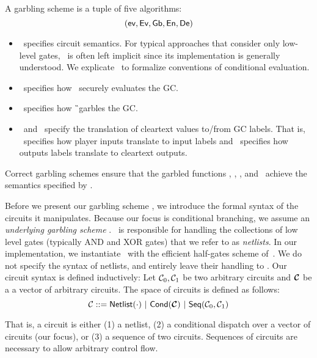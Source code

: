 A garbling scheme is a tuple of five algorithms:
\[ (\textsf{ev}, \textsf{Ev}, \textsf{Gb}, \textsf{En}, \textsf{De}) \]
%
\begin{itemize}
  \item \gev\ specifies circuit semantics. For typical approaches that
    consider only low-level gates, \gev\ is often left implicit since its
    implementation is generally understood. We explicate \gev\ to formalize
    conventions of conditional evaluation.
  \item \gEv\ specifies how \E\ securely evaluates the GC.
  \item \gGb\ specifies how \G\ garbles the GC.
  \item \gEn\ and \gDe\ specify the translation of cleartext values
    to/from GC labels. That is, \gEn\ specifies how player
    inputs translate to input labels and \gDe\ specifies how outputs
    labels translate to cleartext outputs.
\end{itemize}
%
Correct garbling schemes ensure that the garbled functions \gGb, \gEn,
\gEv, and \gDe\ achieve the semantics specified by \gev.

Before we present our garbling scheme \ourschemelong, we introduce the
formal syntax of the circuits it manipulates.
Because our focus is conditional branching, we assume
an \emph{underlying garbling scheme} \underscheme.
\underscheme\ is responsible for handling the collections of low level
gates (typically AND and XOR gates) that we refer to as \emph{netlists}.
In our implementation, we instantiate \underscheme\ with the efficient
half-gates scheme of~\cite{EC:ZahRosEva15}.
We do not specify the syntax of netlists, and entirely leave their
handling to \underscheme.
Our circuit syntax is defined inductively:
Let $\mathcal C_0, \mathcal C_1$ be two arbitrary circuits and $\vec \cir$ be a
a vector of arbitrary circuits. The space of
circuits is defined as follows:
\[
  \cir ::= \netlist(\cdot)~|~%
  \conditional(\vec \cir)~|~%
  \sequential(\cir_0, \cir_1)
\]

That is, a circuit is either (1) a netlist, (2) a conditional dispatch
over a vector of circuits (our focus), or (3) a sequence of two
circuits.
Sequences of circuits are necessary to allow arbitrary
control flow.


